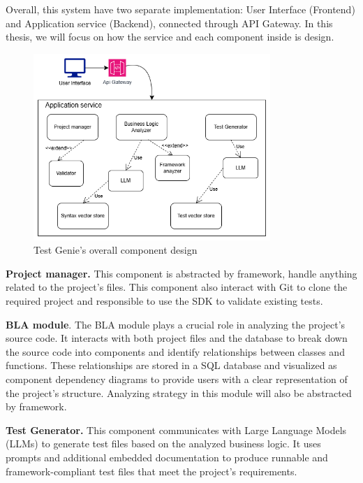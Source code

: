 \hspace{0.5cm}Overall, this system have two separate implementation: User Interface (Frontend) and Application service (Backend), connected through API Gateway. In this thesis, we will focus on how the service and each component inside is design.
\begin{figure}[H]
	\centering
	\includegraphics[width=0.8\textwidth]{images/System design.drawio.png}
	\caption{Test Genie’s overall component design}
	\label{fig:system-design}
\end{figure}

\hspace{0.5cm}\textbf{Project manager.}	This component is abstracted by framework, handle anything related to the project’s files. This component also interact with Git to clone the required project and responsible to use the SDK to validate existing tests.

\hspace{0.5cm}\textbf{BLA module}.	The BLA module plays a crucial role in analyzing the project's source code. It interacts with both project files and the database to break down the source code into components and identify relationships between classes and functions. These relationships are stored in a SQL database and visualized as component dependency diagrams to provide users with a clear representation of the project's structure. Analyzing strategy in this module will also be abstracted by framework.

\hspace{0.5cm}\textbf{Test Generator.}	This component communicates with Large Language Models (LLMs) to generate test files based on the analyzed business logic. It uses prompts and additional embedded documentation to produce runnable and framework-compliant test files that meet the project’s requirements.

